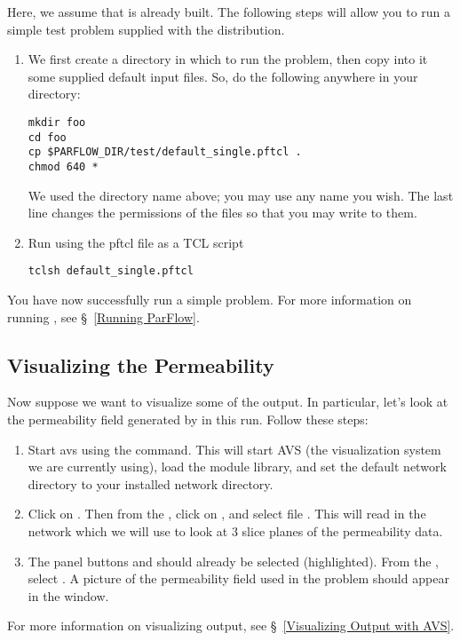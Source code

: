 Here, we assume that \parflow{} is already built.
The following steps will allow you to run a simple test
problem supplied with the distribution.
\begin{enumerate}

\item
We first create a directory in which to run the problem,
then copy into it some supplied default input files.
So, do the following anywhere in your  directory:
\begin{display}\begin{verbatim}
mkdir foo
cd foo
cp $PARFLOW_DIR/test/default_single.pftcl .
chmod 640 *
\end{verbatim}\end{display}
We used the directory name  above;
you may use any name you wish.
The last line changes the permissions of the files so that
you may write to them.

\item
Run \parflow{} using the pftcl file as a TCL script
\begin{display}\begin{verbatim}
tclsh default_single.pftcl
\end{verbatim}\end{display}

\end{enumerate}
You have now successfully run a simple \parflow{} problem.
For more information on running \parflow{},
see \S~\ref{Running ParFlow}.

\subsection*{Visualizing the Permeability}

Now suppose we want to visualize some of the output.
In particular, let's look at the permeability field generated
by \parflow{} in this run.
Follow these steps:
\begin{enumerate}

\item
Start avs using the  command.
This will start AVS (the visualization system we are currently
using), load the \parflow{} module library, and set the default
network directory to your installed \parflow{} network directory.

\item
Click on .
Then from the , click on ,
and select file .
This will read in the  network which we will
use to look at 3 slice planes of the permeability data.

\item
The panel buttons  and 
should already be selected (highlighted).
From the , select .
A picture of the permeability field used in the problem should
appear in the  window.

\end{enumerate}
For more information on visualizing \parflow{} output,
see \S~\ref{Visualizing Output with AVS}.

